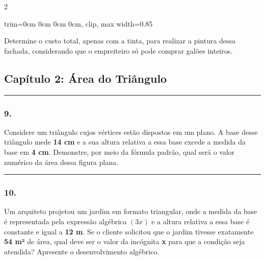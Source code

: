 \documentclass[twoside, 10pt, a4paper]{article}
\newlength{\espacoPosTitulo}\setlength{\espacoPosTitulo}{0.3cm}
\newlength{\espacoPreQuestao}\setlength{\espacoPreQuestao}{0.1cm}
\newlength{\espacoQuestao}\setlength{\espacoQuestao}{0.2cm}
\newcommand{\larguraTikz}{0.85\linewidth}
\begin{document}
\begin{multicols*}{2}
\begin{center}
\begin{adjustbox}{trim=0cm 0cm 0cm 0cm, clip, max width=\larguraTikz}
\end{adjustbox}
\end{center}

Determine o custo total, apenas com a tinta, para realizar a pintura dessa fachada, considerando que o empreiteiro só pode comprar galões inteiros.
\par\vspace{\espacoQuestao}

\subsection*{Capítulo 2: Área do Triângulo}
\vspace{-0.2cm}\noindent\rule{\linewidth}{1.5pt} 
\par\vspace{\espacoPosTitulo}
\subsubsection*{9.} Considere um triângulo cujos vértices estão dispostos em um plano. A base desse triângulo mede \textbf{14 cm} e a sua altura relativa a essa base excede a medida da base em \textbf{4 cm}. Demonstre, por meio da fórmula padrão, qual será o valor numérico da área dessa figura plana.
\par\vspace{\espacoQuestao}

\noindent\textcolor{CorLinha}{\rule{\linewidth}{0.5pt}} 
\par\vspace{\espacoPreQuestao}
\subsubsection*{10.} Um arquiteto projetou um jardim em formato triangular, onde a medida da base é representada pela expressão algébrica $ (3x) $ e a altura relativa a essa base é constante e igual a \textbf{12 m}. Se o cliente solicitou que o jardim tivesse exatamente \textbf{54 m²} de área, qual deve ser o valor da incógnita \textbf{x} para que a condição seja atendida? Apresente o desenvolvimento algébrico.
\par\vspace{\espacoQuestao}


\end{multicols*}
\end{document}
